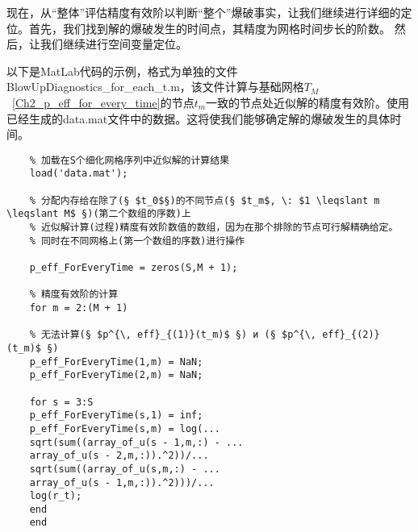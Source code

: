 \documentclass[twoside]{book}
\begin{document}
\begin{CJK*}{GBK}{song}
	
	现在，从``整体''评估精度有效阶以判断``整个''爆破事实，让我们继续进行详细的定位。首先，我们找到解的爆破发生的时间点，其精度为网格时间步长的阶数。 然后，让我们继续进行空间变量定位。
	
	以下是MatLab代码的示例，格式为单独的文件BlowUpDiagnostics\_for\_each\_t.m，该文件计算与基础网格$T_M$~\eqref{Ch2_p_eff_for_every_time}的节点$t_m$一致的节点处近似解的精度有效阶。使用已经生成的data.mat文件中的数据。这将使我们能够确定解的爆破发生的具体时间。
	\begin{lstlisting}
	% 加载在S个细化网格序列中近似解的计算结果
	load('data.mat');
	
	% 分配内存给在除了(§ $t_0$§)的不同节点(§ $t_m$, \: $1 \leqslant m \leqslant M$ §)(第二个数组的序数)上
	% 近似解计算(过程)精度有效阶数值的数组，因为在那个排除的节点可行解精确给定。
	% 同时在不同网格上(第一个数组的序数)进行操作

	p_eff_ForEveryTime = zeros(S,M + 1);
	
	% 精度有效阶的计算
	for m = 2:(M + 1)
	
	% 无法计算(§ $p^{\, eff}_{(1)}(t_m)$ §) и (§ $p^{\, eff}_{(2)}(t_m)$ §)
	p_eff_ForEveryTime(1,m) = NaN;
	p_eff_ForEveryTime(2,m) = NaN;
	
	for s = 3:S
	p_eff_ForEveryTime(s,1) = inf;
	p_eff_ForEveryTime(s,m) = log(...
	sqrt(sum((array_of_u(s - 1,m,:) - ...
	array_of_u(s - 2,m,:)).^2))/...
	sqrt(sum((array_of_u(s,m,:) - ...
	array_of_u(s - 1,m,:)).^2)))/...
	log(r_t);
	end
	end
	

\end{lstlisting}
\end{CJK*}
\end{document}
